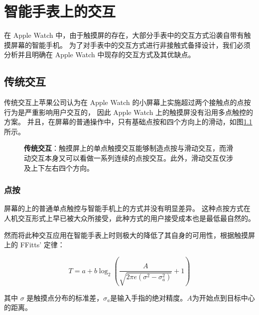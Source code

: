 \chapter{智能手表上的交互}

\quad\quad 在 Apple Watch 中，由于触摸屏的存在，大部分手表中的交互方式沿袭自带有触摸屏幕的智能手机\cite{WatchGuidelines:2016}。
为了对手表中的交互方式进行非接触式备择设计，我们必须分析并且明确在 Apple Watch 中现存的交互方式及其优缺点。

\section{传统交互}

传统交互上苹果公司认为在 Apple Watch 的小屏幕上实施超过两个接触点的点按行为是严重影响用户交互的，
因此 Apple Watch 上的触摸屏没有沿用多点触控的方案。
并且，在屏幕的普通操作中，只有基础点按和四个方向上的滑动，如图\ref{fig:gesture}所示。

\begin{figure}[H]
    \kaishu
    \centering
    \caption{\textbf{传统交互}：触摸屏上的单点触摸交互能够制造点按与滑动交互，而滑动交互本身又可以看做一系列连续的点按交互。此外，滑动交互仅涉及上下左右四个方向。}
    \label{fig:gesture}
\end{figure}

\subsection{点按}

屏幕的上的普通单点触控与智能手机上的方式并没有明显差异。
这种点按方式在人机交互形式上早已被大众所接受，此种方式的用户接受成本也是最低最自然的。

然而将此种交互应用在智能手表上时则极大的降低了其自身的可用性，根据触摸屏上的 FFitts' 定律\cite{Bi:2013:FLM:2470654.2466180}：

\begin{equation}
T=a+b\log_{2}{\left(\frac{A}{\sqrt{2\pi e(\sigma^2-\sigma_{a}^2)}}+1 \right)}
\end{equation}

其中 $\sigma$ 是触摸点分布的标准差，$\sigma_a$是输入手指的绝对精度。$A$为开始点到目标中心的距离。

